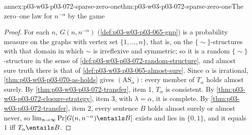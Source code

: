 \begin{annexitem}{annex:p03-w03-p03-072-sparse-zero-one}{thm:p03-w03-p03-072-sparse-zero-one}{The zero--one law for \(n^{-\alpha}\) by the game}
\begin{proof}
For each \(n\), \(G(n,n^{-\alpha})\) (\cref{def:p03-w03-p03-065-gnp}) is a
probability measure on the graphs with vertex set \(\{1,\ldots,n\}\), that
is, on the \(\{\sim\}\)-structures with that domain in which \(\sim\) is
irreflexive and symmetric; so it is a random \(\{\sim\}\)-structure in the
sense of \cref{def:p03-w03-p03-072-random-structure}, and almost sure truth
there is that of \cref{def:p03-w03-p03-065-almost-sure}.  Since
\(\alpha\) is irrational, \cref{thm:p03-w03-p03-070-as-holds} gives
\((\mathrm{AS}_\alpha)\): every member of \(T_\alpha\) holds almost surely.
By \cref{thm:p03-w03-p03-072-transfer}, item 1, \(T_\alpha\) is consistent.
By \cref{thm:p03-w03-p03-072-closure-strategy}, item 3, with
\(\lambda=\alpha\), it is complete.  By
\cref{thm:p03-w03-p03-072-transfer}, item 2, every sentence \(B\) holds
almost surely or almost never, so
\(\lim_{n\to\infty}\Pr[G(n,n^{-\alpha})\entails B]\) exists and lies in
\(\{0,1\}\), and it equals \(1\) iff \(T_\alpha\entails B\).
\end{proof}
\end{annexitem}
